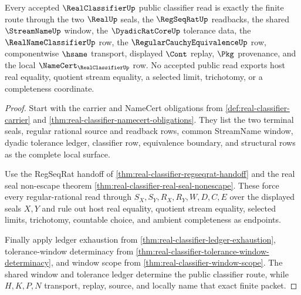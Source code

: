 \begin{theorem}
\label{thm:realclassifier-public-exactness-surface}
Every accepted $\RealClassifierUp$ public classifier read is exactly the finite route through the two $\RealUp$ seals, the $\RegSeqRatUp$ readbacks, the shared $\StreamNameUp$ window, the $\DyadicRatCoreUp$ tolerance data, the $\RealNameClassifierUp$ row, the $\RegularCauchyEquivalenceUp$ row, componentwise $\hsame$ transport, displayed $\Cont$ replay, $\Pkg$ provenance, and the local $\NameCert_{\RealClassifierUp}$ row. No accepted public read exports host real equality, quotient stream equality, a selected limit, trichotomy, or a completeness coordinate.
\end{theorem}
\begin{proof}
Start with the carrier and NameCert obligations from \autoref{def:real-classifier-carrier} and \autoref{thm:real-classifier-namecert-obligations}. They list the two terminal seals, regular rational source and readback rows, common StreamName window, dyadic tolerance ledger, classifier row, equivalence boundary, and structural rows as the complete local surface.

Use the RegSeqRat handoff of \autoref{thm:real-classifier-regseqrat-handoff} and the real seal non-escape theorem \autoref{thm:real-classifier-real-seal-nonescape}. These force every regular-rational read through $S_X,S_Y,R_X,R_Y,W,D,C,E$ over the displayed seals $X,Y$ and rule out host real equality, quotient stream equality, selected limits, trichotomy, countable choice, and ambient completeness as endpoints.

Finally apply ledger exhaustion from \autoref{thm:real-classifier-ledger-exhaustion}, tolerance-window determinacy from \autoref{thm:real-classifier-tolerance-window-determinacy}, and window scope from \autoref{thm:real-classifier-window-scope}. The shared window and tolerance ledger determine the public classifier route, while $H,K,P,N$ transport, replay, source, and locally name that exact finite packet.
\end{proof}

